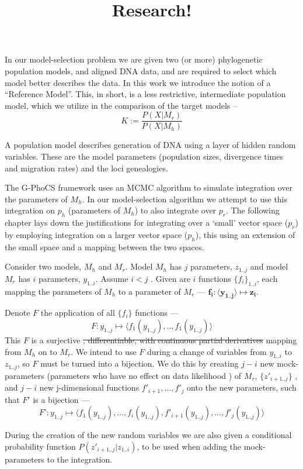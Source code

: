 \documentclass[10pt,a4paper]{article}
\title{Research!}
\begin{document}
\maketitle


In our model-selection problem we are given two (or more) phylogenetic population models, and aligned DNA data, and are required to select which model better describes the data. 
In this work we introduce the notion of a “Reference Model”. This, in short, is a less restrictive, intermediate population model, which we utilize in the comparison of the target models – 
\[K:=\frac{P(X|M_r)}{P(X|M_h)}\]

A population model describes generation of DNA using a layer of hidden random variables. These are the model parameters (population sizes, divergence times and migration rates) and the loci genealogies.

The G-PhoCS framework uses an MCMC algorithm to simulate integration over the parameters of $M_h$. In our model-selection algorithm we attempt to use this integration on $p_h$ (parameters of $M_h$) to also integrate over $p_r$. The following chapter lays down the justifications for integrating over a ‘small’ vector space ($p_r$) by employing integration on a larger vector space ($p_h$), this using an extension of the small space and a mapping between the two spaces.

Consider two models, $M_h$ and $M_r$. Model $M_h$ has $j$ parameters, $z_{1..j}$ and model $M_r$ has $i$ parameters, $y_{1..i}$.  Assume $i<j$ .
Given are $i$ functions $\{f_i\}_{1..i}$, each mapping the parameters of $M_h$ to a parameter of $M_r$ --- $\mathbf{f_i:\langle y_{1..j} \rangle \mapsto z_i}$. 

Denote $F$ the application of all $\{f_i\}$ functions --- 
\[F: y_{1..j} \mapsto \langle f_1(y_{1..j} ), .., f_1(y_{1..j} ) \rangle \]
 This $F$ is a surjective \sout{, differentiable, with continuous partial derivatives} mapping  from $M_h$ on to $M_r$. We intend to use $F$ during a change of variables from $y_{1..i}$ to $z_{1..j}$, so $F$ must be turned into a bijection. We do this by creating $j-i$ new mock-parameters (parameters who have no effect on data likelihood ) of $M_r$, $\{z'_{i+1..j}\}$ , and $j-i$ new j-dimensional functions ${f'_{i+1}, ..., f'_j}$ onto the new parameters, such that $F'$ is a bijection ---
 \[F’:y_{1..j} \mapsto \langle f_1(y_{1..j} ), ..., f_i( y_{1..j} ),f'_{i+1}(y_{1..j} ), ..., f'_{j}(y_{1..j})\rangle\] 

During the creation of the new random variables we are also given a conditional probability function $P(z'_{i+1..j} | z_{1..i})$, to be used when adding the mock-parameters to the integration.
\end{document}
